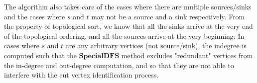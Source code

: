 \documentclass{article}
\begin{document}
The algorithm also takes care of the cases where there are multiple sources/sinks and the cases where $s$ and $t$ may not be a source and a sink respectively. From the property of topological sort, we know that all the sinks arrive at the very end of the topological ordering, and all the sources arrive at the very beginning. In cases where $s$ and $t$ are any arbitrary vertices (not source/sink), the indegree is computed such that the $\textbf{SpecialDFS}$ method excludes "redundant" vertices from the in-degree and out-degree computation, and so that they are not able to interfere with the cut vertex identification process.
\end{document}
